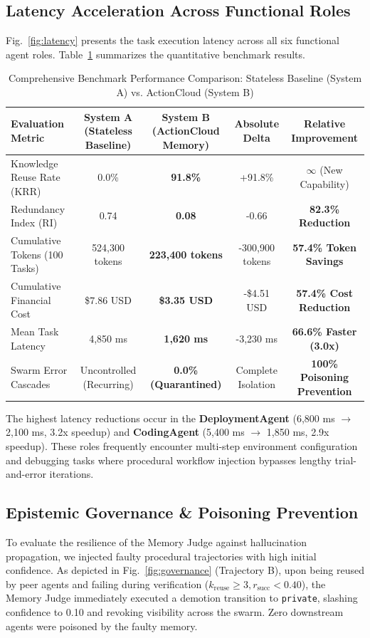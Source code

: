 \documentclass[lettersize,journal]{IEEEtran}
\begin{document}
\subsection{Latency Acceleration Across Functional Roles}
Fig.~\ref{fig:latency} presents the task execution latency across all six functional agent roles. Table~\ref{tab:results_summary} summarizes the quantitative benchmark results.

\begin{table}[!t]
\centering
\caption{Comprehensive Benchmark Performance Comparison: Stateless Baseline (System A) vs. ActionCloud (System B)}
\label{tab:results_summary}
\setlength{\tabcolsep}{6pt}
\renewcommand{\arraystretch}{1.2}
\begin{tabular}{lcccc}
\toprule
\textbf{Evaluation Metric} & \textbf{System A (Stateless Baseline)} & \textbf{System B (ActionCloud Memory)} & \textbf{Absolute Delta} & \textbf{Relative Improvement} \\
\midrule
Knowledge Reuse Rate (KRR) & 0.0\% & \textbf{91.8\%} & +91.8\% & $\infty$ (New Capability) \\
Redundancy Index (RI) & 0.74 & \textbf{0.08} & -0.66 & \textbf{82.3\% Reduction} \\
Cumulative Tokens (100 Tasks) & 524,300 tokens & \textbf{223,400 tokens} & -300,900 tokens & \textbf{57.4\% Token Savings} \\
Cumulative Financial Cost & \$7.86 USD & \textbf{\$3.35 USD} & -\$4.51 USD & \textbf{57.4\% Cost Reduction} \\
Mean Task Latency & 4,850 ms & \textbf{1,620 ms} & -3,230 ms & \textbf{66.6\% Faster (3.0x)} \\
Swarm Error Cascades & Uncontrolled (Recurring) & \textbf{0.0\% (Quarantined)} & Complete Isolation & \textbf{100\% Poisoning Prevention} \\
\bottomrule
\end{tabular}
\end{table}

The highest latency reductions occur in the \textbf{DeploymentAgent} (6,800 ms $\rightarrow$ 2,100 ms, 3.2x speedup) and \textbf{CodingAgent} (5,400 ms $\rightarrow$ 1,850 ms, 2.9x speedup). These roles frequently encounter multi-step environment configuration and debugging tasks where procedural workflow injection bypasses lengthy trial-and-error iterations.

\subsection{Epistemic Governance \& Poisoning Prevention}
To evaluate the resilience of the Memory Judge against hallucination propagation, we injected faulty procedural trajectories with high initial confidence. As depicted in Fig.~\ref{fig:governance} (Trajectory B), upon being reused by peer agents and failing during verification ($k_{\text{reuse}} \ge 3, r_{\text{succ}} < 0.40$), the Memory Judge immediately executed a demotion transition to \texttt{private}, slashing confidence to 0.10 and revoking visibility across the swarm. Zero downstream agents were poisoned by the faulty memory.
\end{document}
